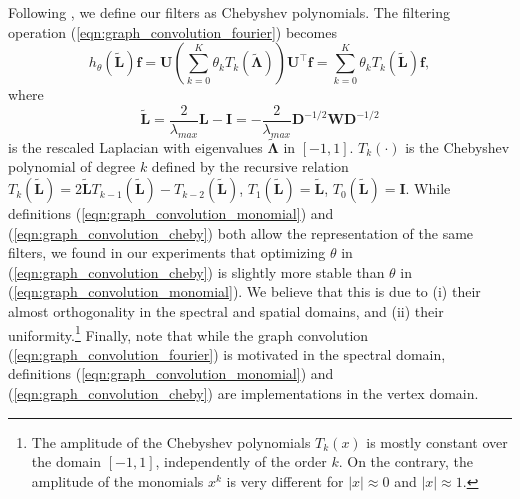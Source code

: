 \documentclass[final,twocolumn,3p,times,sort&compress]{elsarticle}
\newcommand{\eqnref}[1]{(\ref{eqn:#1})}
\renewcommand{\b}[1]{{\bm{#1}}}   %
\newcommand{\1}{\b{1}}              %
\newcommand{\0}{\b{0}}              %
\renewcommand{\L}{\b{L}}
\newcommand{\tL}{\tilde{\L}}
\newcommand{\W}{\b{W}}
\newcommand{\D}{\b{D}}
\newcommand{\U}{\b{U}}
\newcommand{\f}{\b{f}}
\newcommand{\trans}{^\intercal}
\newcommand{\bLambda}{\b{\Lambda}}
\begin{document}
Following \citep{defferrard2016convolutional}, we define our filters as Chebyshev polynomials.
The filtering operation \eqnref{graph_convolution_fourier} becomes
\begin{equation} \label{eqn:graph_convolution_cheby}
	h_\theta\left(\tL\right) \f = \U \left(\sum_{k=0}^K \theta_k T_k\left(\tilde{\bLambda}\right) \right) \U\trans \f = \sum_{k=0}^K \theta_k T_k\left(\tL\right) \f,
\end{equation}
where
\begin{equation*}
	\tL = \frac{2}{\lambda_{max}} \L - \b{I} = -\frac{2}{\lambda_{max}} \D^{-1/2} \W \D^{-1/2}
\end{equation*}
is the rescaled Laplacian with eigenvalues $\tilde{\b \Lambda}$ in $[-1, 1]$.
$T_k(\cdot)$ is the Chebyshev polynomial of degree $k$ defined by the recursive relation $T_k(\tL) = 2\tL T_{k-1}(\tL) - T_{k-2}(\tL)$, $T_1(\tL) = \tL$, $T_0(\tL) = \b{I}$.
While definitions \eqnref{graph_convolution_monomial} and \eqnref{graph_convolution_cheby} both allow the representation of the same filters, we found in our experiments that optimizing $\theta$ in \eqnref{graph_convolution_cheby} is slightly more stable than $\theta$ in \eqnref{graph_convolution_monomial}.
We believe that this is due to (i) their almost orthogonality in the spectral and spatial domains, and (ii) their uniformity.\footnote{The amplitude of the Chebyshev polynomials $T_k(x)$ is mostly constant over the domain $[-1, 1]$, independently of the order $k$. On the contrary, the amplitude of the monomials $x^k$ is very different for $|x|\approx 0$ and $|x| \approx 1$.}
Finally, note that while the graph convolution \eqnref{graph_convolution_fourier} is motivated in the spectral domain, definitions \eqnref{graph_convolution_monomial} and \eqnref{graph_convolution_cheby} are implementations in the vertex domain.
\end{document}
